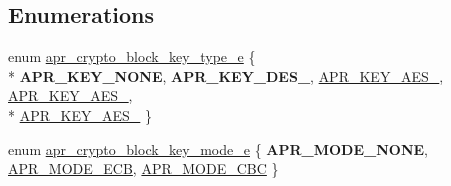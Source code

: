\subsection*{Enumerations}
\begin{DoxyCompactItemize}
\item 
enum \hyperlink{group___a_p_r___util___crypto_gac62c799021d3bc28449626e60351e946}{apr\-\_\-crypto\-\_\-block\-\_\-key\-\_\-type\-\_\-e} \{ \\*
{\bfseries A\-P\-R\-\_\-\-K\-E\-Y\-\_\-\-N\-O\-N\-E}, 
{\bfseries A\-P\-R\-\_\-\-K\-E\-Y\-\_\-D\-E\-S\-\_}, 
\hyperlink{group___a_p_r___util___crypto_ggac62c799021d3bc28449626e60351e946a8c1d6aff8c24a476659f4ef074832ee6}{A\-P\-R\-\_\-\-K\-E\-Y\-\_\-\-A\-E\-S\-\_}, 
\hyperlink{group___a_p_r___util___crypto_ggac62c799021d3bc28449626e60351e946aff350305e3e825a8b3fa0b0a6fc9804a}{A\-P\-R\-\_\-\-K\-E\-Y\-\_\-\-A\-E\-S\-\_}, 
\\*
\hyperlink{group___a_p_r___util___crypto_ggac62c799021d3bc28449626e60351e946add6da30b44e6546ef242b8d1d21ca9bc}{A\-P\-R\-\_\-\-K\-E\-Y\-\_\-\-A\-E\-S\-\_}
 \}
\item 
enum \hyperlink{group___a_p_r___util___crypto_gad29b01edfcd38649f12d76e803dd2153}{apr\-\_\-crypto\-\_\-block\-\_\-key\-\_\-mode\-\_\-e} \{ {\bfseries A\-P\-R\-\_\-\-M\-O\-D\-E\-\_\-\-N\-O\-N\-E}, 
\hyperlink{group___a_p_r___util___crypto_ggad29b01edfcd38649f12d76e803dd2153af7eb194825aa815880ddef6f3ad1ce14}{A\-P\-R\-\_\-\-M\-O\-D\-E\-\_\-\-E\-C\-B}, 
\hyperlink{group___a_p_r___util___crypto_ggad29b01edfcd38649f12d76e803dd2153a4830062ad4c3ae50545c9b5b0ef0bc49}{A\-P\-R\-\_\-\-M\-O\-D\-E\-\_\-\-C\-B\-C}
 \}
\end{DoxyCompactItemize}
